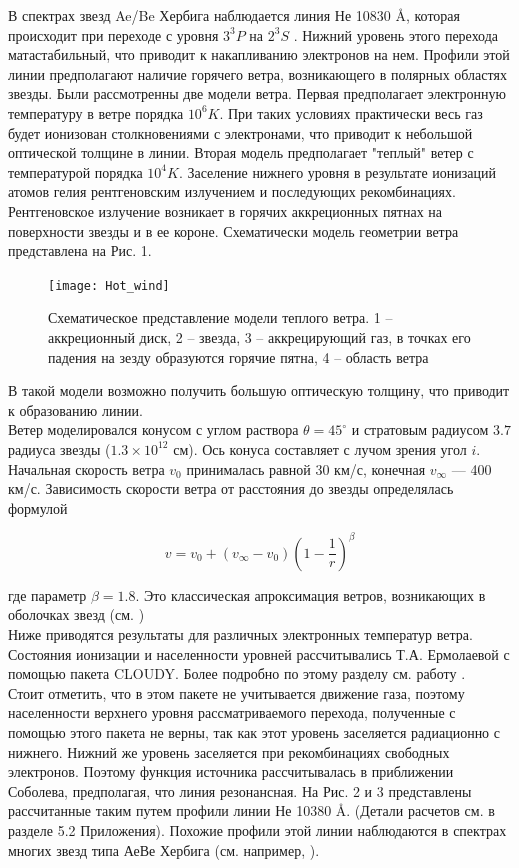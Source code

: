 \documentclass{article}
\begin{document}
В спектрах звезд Ae/Be Хербига наблюдается линия Не 10830 \AA, которая происходит при переходе с уровня $3^3P$ на $2^3S$ . Нижний уровень этого перехода матастабильный, что приводит к накапливанию электронов на нем. Профили этой линии предполагают наличие горячего ветра, возникающего в полярных областях звезды. Были рассмотренны две модели ветра. Первая предполагает электронную температуру в ветре порядка $10^6 K$. При таких условиях практически весь газ будет ионизован столкновениями с электронами, что приводит к небольшой оптической толщине в линии. Вторая модель предполагает "теплый" ветер с температурой порядка $10^4 K$. Заселение нижнего уровня в результате ионизаций атомов гелия рентгеновским излучением и последующих рекомбинациях. Рентгеновское излучение возникает в горячих аккреционных пятнах на поверхности звезды и в ее короне. Схематически модель геометрии ветра представлена на Рис. 1. 

\begin{figure} [h]
    \centering
    \texttt{[image: Hot\_wind]}
    \caption{Схематическое представление модели теплого ветра. 1 -- аккреционный диск, 2 -- звезда, 3 -- аккрецирующий газ, в точках его падения на зезду образуются горячие пятна, 4 -- область ветра}
\end{figure}

В такой модели возможно получить большую оптическую толщину, что приводит к образованию линии.  \\
Ветер моделировался конусом с углом раствора $\theta=45^\circ$ и стратовым радиусом $3.7$ радиуса звезды ($1.3\times 10^{12}$ см). Ось конуса составляет с лучом зрения угол $i$.  Начальная скорость ветра $v_0$ принималась равной 30 км/с, конечная $v_\infty$ --- 400 км/с. Зависимость скорости ветра от расстояния до звезды определялась формулой  

\[
v = v_0 + \left(v_{\infty} - v_0\right)\left(1 - \frac{1}{r}\right)^\beta
\] 

где параметр $\beta = 1.8$. Это классическая апроксимация ветров, возникающих в оболочках звезд (см. \cite{castor79}) \\
Ниже приводятся результаты для различных электронных температур ветра. Состояния ионизации и населенности уровней рассчитывались Т.А. Ермолаевой с помощью пакета CLOUDY. Более подробно по этому разделу см. работу \cite{tamara}.\\
Стоит отметить, что в этом пакете не учитывается движение газа, поэтому населенности верхнего уровня рассматриваемого перехода, полученные с помощью этого пакета не верны, так как этот уровень заселяется радиационно с нижнего. Нижний же уровень заселяется при рекомбинациях свободных электронов. Поэтому функция источника рассчитывалась в приближении Соболева, предполагая, что линия резонансная. На Рис. 2 и 3 представлены рассчитанные таким путем профили линии Не 10380 \AA. (Детали расчетов см. в разделе 5.2 Приложения). Похожие профили этой линии наблюдаются в спектрах многих звезд типа АеВе Хербига (см. например, \cite{cauley}).
\end{document}

